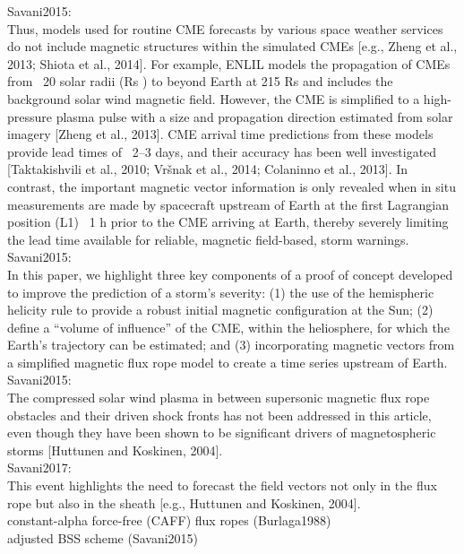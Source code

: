 Savani2015:\\
Thus, models used for routine CME forecasts by various space weather services do not include magnetic structures within the simulated CMEs [e.g., Zheng et al., 2013; Shiota et al., 2014]. For example, ENLIL models the propagation of CMEs from ~20 solar radii (Rs ) to beyond Earth at 215 Rs and includes the background solar wind magnetic field. However, the CME is simplified to a high-pressure plasma pulse with a size and propagation direction estimated from solar imagery [Zheng et al., 2013]. CME arrival time predictions from these models provide lead times of ~2–3 days, and their accuracy has been well investigated [Taktakishvili et al., 2010; Vršnak et al., 2014; Colaninno et al., 2013]. In contrast, the important magnetic vector information is only revealed when in situ measurements are made by spacecraft upstream of Earth at the first Lagrangian position (L1) ~1 h prior to the CME arriving at Earth, thereby severely limiting the lead time available for reliable, magnetic field-based, storm warnings.\\
Savani2015:\\
In this paper, we highlight three key components of a proof of concept developed to improve the prediction of a storm’s severity: (1) the use of the hemispheric helicity rule to provide a robust initial magnetic configuration at the Sun; (2) define a “volume of influence” of the CME, within the heliosphere, for which the Earth’s trajectory can be estimated; and (3) incorporating magnetic vectors from a simplified magnetic flux rope model to create a time series upstream of Earth.\\
Savani2015:\\
The compressed solar wind plasma in between supersonic magnetic flux rope obstacles and their driven shock fronts has not been addressed in this article, even though they have been shown to be significant drivers of magnetospheric storms [Huttunen and Koskinen, 2004].\\
Savani2017:\\
This event highlights the need to forecast the field vectors not only in the flux rope but also in the sheath [e.g., Huttunen and Koskinen, 2004].\\

constant-alpha force-free (CAFF) flux ropes (Burlaga1988)\\

adjusted BSS scheme (Savani2015)\\

